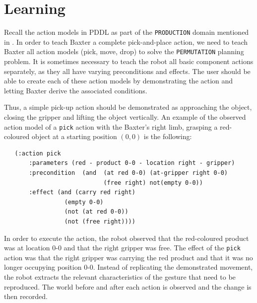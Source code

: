 \section{Learning}
\label{Create an action model}
Recall the action models in PDDL as part of the \texttt{PRODUCTION} domain mentioned in . In order to teach Baxter a complete pick-and-place action, we need to teach Baxter all action models (pick, move, drop) to solve the \texttt{PERMUTATION} planning problem. It is sometimes necessary to teach the robot all basic component actions separately, as they all have varying preconditions and effects. The user should be able to create each of these action models by demonstrating the action and letting Baxter derive the associated conditions.  %

Thus, a simple pick-up action should be demonstrated as approaching the object, closing the gripper and lifting the object vertically. An example of the observed action model of a \texttt{pick} action with the Baxter's right limb, grasping a red-coloured object at a starting position $(0,0)$ is the following:

\begin{verbatim}
   (:action pick
       :parameters (red - product 0-0 - location right - gripper)
       :precondition  (and  (at red 0-0) (at-gripper right 0-0) 
                            (free right) not(empty 0-0))
       :effect (and (carry red right)
                 (empty 0-0)
                 (not (at red 0-0)) 
                 (not (free right))))
\end{verbatim}
In order to execute the action, the robot observed that the red-coloured product was at location 0-0 and that the right gripper was free. The effect of the \texttt{pick} action was that the right gripper was carrying the red product and that it was no longer occupying position 0-0.
Instead of replicating the demonstrated movement, the robot extracts the relevant characteristics of the gesture that need to be reproduced. %
The world before and after each action is observed and the change is then recorded. 

